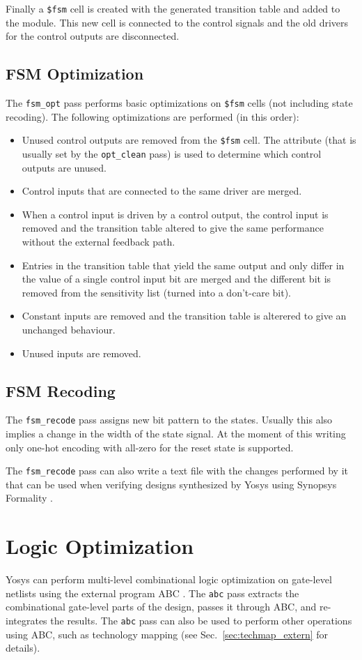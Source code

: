 Finally a {\tt \$fsm} cell is created with the generated transition table and added to the
module. This new cell is connected to the control signals and the old drivers for the
control outputs are disconnected.

\subsection{FSM Optimization}

The {\tt fsm\_opt} pass performs basic optimizations on {\tt \$fsm} cells (not including state
recoding). The following optimizations are performed (in this order):

\begin{itemize}
\item Unused control outputs are removed from the {\tt \$fsm} cell. The attribute 
(that is usually set by the {\tt opt\_clean} pass) is used to determine which control
outputs are unused.
\item Control inputs that are connected to the same driver are merged.
\item When a control input is driven by a control output, the control input is removed and the transition
table altered to give the same performance without the external feedback path.
\item Entries in the transition table that yield the same output and only
differ in the value of a single control input bit are merged and the different bit is removed
from the sensitivity list (turned into a don't-care bit).
\item Constant inputs are removed and the transition table is alterered to give an unchanged behaviour.
\item Unused inputs are removed.
\end{itemize}

\subsection{FSM Recoding}

The {\tt fsm\_recode} pass assigns new bit pattern to the states. Usually this
also implies a change in the width of the state signal. At the moment of this
writing only one-hot encoding with all-zero for the reset state is supported.

The {\tt fsm\_recode} pass can also write a text file with the changes performed
by it that can be used when verifying designs synthesized by Yosys using Synopsys
Formality .

\section{Logic Optimization}

Yosys can perform multi-level combinational logic optimization on gate-level netlists using the
external program ABC . The {\tt abc} pass extracts the combinational gate-level
parts of the design, passes it through ABC, and re-integrates the results. The {\tt abc} pass
can also be used to perform other operations using ABC, such as technology mapping (see
Sec.~\ref{sec:techmap_extern} for details).

